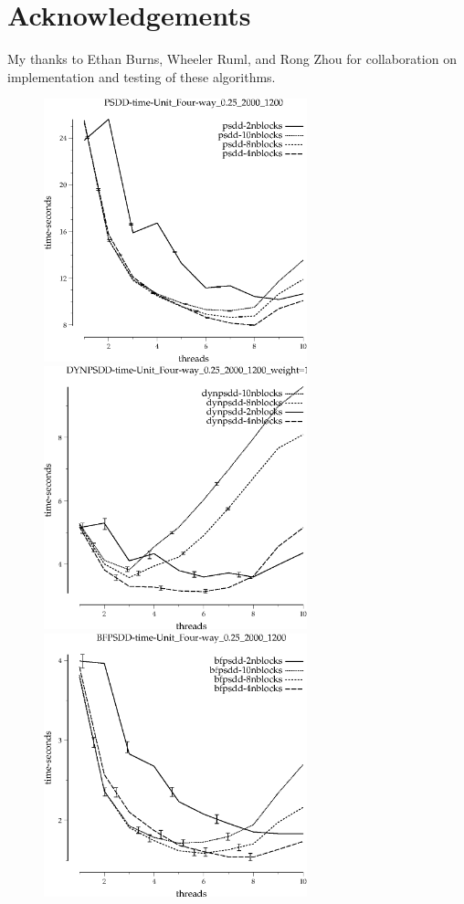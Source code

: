 \documentclass{article}
\begin{document}
\section{Acknowledgements}
My thanks to Ethan Burns, Wheeler Ruml, and Rong Zhou for collaboration on implementation and testing of these algorithms.




\begin{appendices}
\begin{figure}[h!]
\includegraphics[width=3in]{../graphs/grid_unit_four-way_0.25_2000_1200/PSDD-time-Unit_Four-way_0.25_2000_1200.eps}
\includegraphics[width=3in]{../graphs/grid_unit_four-way_0.25_2000_1200/DYNPSDD-time-Unit_Four-way_0.25_2000_1200_weight=1.5.eps}
\includegraphics[width=3in]{../graphs/grid_unit_four-way_0.25_2000_1200/BFPSDD-time-Unit_Four-way_0.25_2000_1200.eps}

\end{figure}
\end{appendices}
\end{document}

